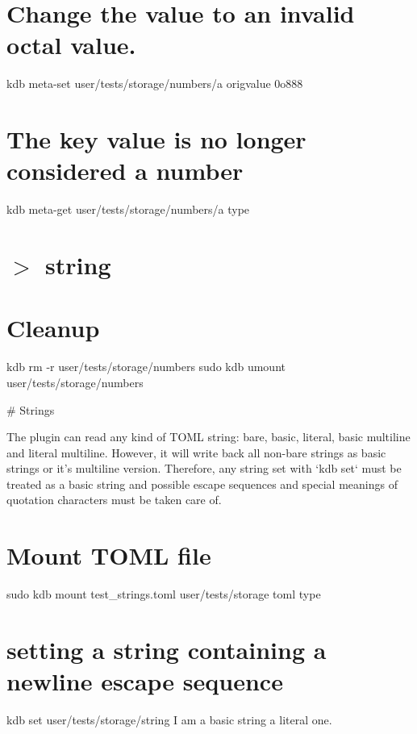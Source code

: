 \hypertarget{autotoc_md693_autotoc_md737}{}\section{Change the value to an invalid octal value.}\label{autotoc_md693_autotoc_md737}
kdb meta-\/set \textquotesingle{}user/tests/storage/numbers/a\textquotesingle{} \textquotesingle{}origvalue\textquotesingle{} \textquotesingle{}0o888\textquotesingle{}\hypertarget{autotoc_md693_autotoc_md738}{}\section{The key value is no longer considered a number}\label{autotoc_md693_autotoc_md738}
kdb meta-\/get \textquotesingle{}user/tests/storage/numbers/a\textquotesingle{} \textquotesingle{}type\textquotesingle{} \hypertarget{autotoc_md693_autotoc_md739}{}\section{$>$ string}\label{autotoc_md693_autotoc_md739}
\hypertarget{autotoc_md693_autotoc_md740}{}\section{Cleanup}\label{autotoc_md693_autotoc_md740}
kdb rm -\/r user/tests/storage/numbers sudo kdb umount user/tests/storage/numbers 
\begin{DoxyCode}
# Strings

The plugin can read any kind of TOML string: bare, basic, literal, basic multiline and literal multiline.
However, it will write back all non-bare strings as basic strings or it's multiline version.
Therefore, any string set with `kdb set` must be treated as a basic string and possible escape sequences
       and special meanings of quotation characters must be taken care of.
\end{DoxyCode}
 \hypertarget{autotoc_md693_autotoc_md741}{}\section{Mount T\+O\+M\+L file}\label{autotoc_md693_autotoc_md741}
sudo kdb mount test\+\_\+strings.\+toml user/tests/storage toml type\hypertarget{autotoc_md693_autotoc_md742}{}\section{setting a string containing a newline escape sequence}\label{autotoc_md693_autotoc_md742}
kdb set \textquotesingle{}user/tests/storage/string\textquotesingle{} \textquotesingle{}I am a basic string a literal one.\textquotesingle{}

